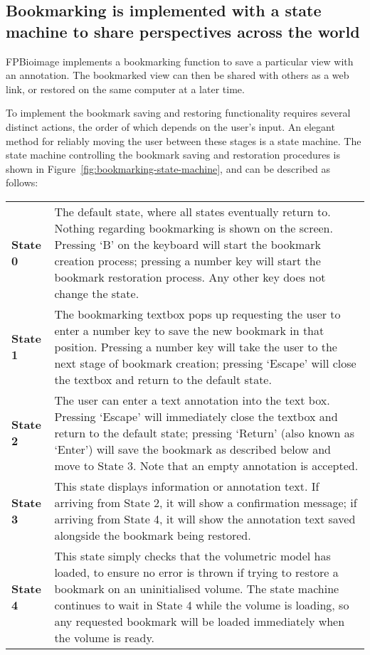 \subsection{Bookmarking is implemented with a state machine to share perspectives across the world}
FPBioimage implements a bookmarking function to save a particular view with an annotation.
The bookmarked view can then be shared with others as a web link, or restored on the same computer at a later time.

To implement the bookmark saving and restoring functionality requires several distinct actions, the order of which depends on the user's input.
An elegant method for reliably moving the user between these stages is a state machine.
The state machine controlling the bookmark saving and restoration procedures is shown in Figure~\ref{fig:bookmarking-state-machine}, and can be described as follows:
\begin{tabular}{>{\bfseries}l p{}}
State 0 & The default state, where all states eventually return to. Nothing regarding bookmarking is shown on the screen. Pressing `B' on the keyboard will start the bookmark creation process; pressing a number key will start the bookmark restoration process. Any other key does not change the state. \\
State 1 & The bookmarking textbox pops up requesting the user to enter a number key to save the new bookmark in that position. Pressing a number key will take the user to the next stage of bookmark creation; pressing `Escape' will close the textbox and return to the default state. \\
State 2 & The user can enter a text annotation into the text box. Pressing `Escape' will immediately close the textbox and return to the default state; pressing `Return' (also known as `Enter') will save the bookmark as described below and move to State 3. Note that an empty annotation is accepted. \\
State 3 & This state displays information or annotation text. If arriving from State 2, it will show a confirmation message; if arriving from State 4, it will show the annotation text saved alongside the bookmark being restored. \\
State 4 & This state simply checks that the volumetric model has loaded, to ensure no error is thrown if trying to restore a bookmark on an uninitialised volume. The state machine continues to wait in State 4 while the volume is loading, so any requested bookmark will be loaded immediately when the volume is ready. \\
\end{tabular}

